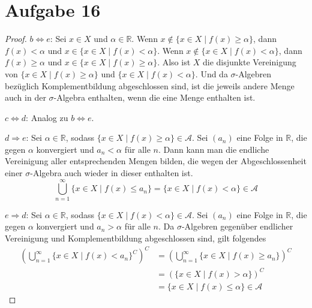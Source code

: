 \documentclass[10pt,a4paper]{article}
\begin{document}
\section{Aufgabe 16}
\begin{proof}
  $b \Leftrightarrow e$: Sei $x \in X$ und $\alpha \in \mathbb{R}$.
  Wenn $x \notin \{ x \in X \mid f(x) \ge \alpha \}$, dann $f(x) < \alpha$ und $x \in \{ x \in X \mid f(x) < \alpha \}$.
  Wenn $x \notin \{ x \in X \mid f(x) < \alpha \}$, dann $f(x) \ge \alpha$ und $x \in \{ x \in X \mid f(x) \ge \alpha \}$.
  Also ist $X$ die disjunkte Vereinigung von $\{ x \in X \mid f(x) \ge \alpha \}$ und $\{ x \in X \mid f(x) < \alpha \}$.
  Und da $\sigma$-Algebren bezüglich Komplementbildung abgeschlossen sind, ist die jeweils andere Menge auch in der $\sigma$-Algebra enthalten, wenn die eine Menge enthalten ist.

  $c \Leftrightarrow d$: Analog zu $b \Leftrightarrow e$.

  $d \Rightarrow e$: Sei $\alpha \in \mathbb{R}$, sodass $\{ x \in X \mid f(x) \ge \alpha \} \in \mathscr{A}$.
  Sei $(a_{n})$ eine Folge in $\mathbb{R}$, die gegen $\alpha$ konvergiert und $a_{n} < \alpha$ für alle $n$.
  Dann kann man die endliche Vereinigung aller entsprechenden Mengen bilden, die wegen der Abgeschlossenheit einer $\sigma$-Algebra auch wieder in dieser enthalten ist.
  \begin{equation}
    \bigcup_{n = 1}^{\infty} \{ x \in X \mid f(x) \le a_{n} \} = \{ x \in X \mid f(x) < \alpha \} \in \mathscr{A}
  \end{equation}

  $e \Rightarrow d$: Sei $\alpha \in \mathbb{R}$, sodass $\{ x \in X \mid f(x) < \alpha \} \in \mathscr{A}$.
  Sei $(a_{n})$ eine Folge in $\mathbb{R}$, die gegen $\alpha$ konvergiert und $a_{n} > \alpha$ für alle $n$.
  Da $\sigma$-Algebren gegenüber endlicher Vereinigung und Komplementbildung abgeschlossen sind, gilt folgendes
  \begin{align*}
    \left( \bigcup_{n = 1}^{\infty} \{ x \in X \mid f(x) < a_{n} \}^{C} \right)^{C} & = \left( \bigcup_{n = 1}^{\infty} \{ x \in X \mid f(x) \ge a_{n} \} \right)^{C}\\
    & = \left( \{ x \in X \mid f(x) > \alpha \} \right)^{C}\\
    & = \{ x \in X \mid f(x) \le \alpha \} \in \mathscr{A}
  \end{align*}
\end{proof}
\end{document}
